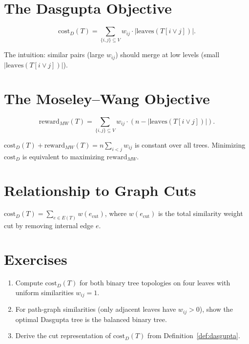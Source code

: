 \section{The Dasgupta Objective}

\begin{definition}
\label{def:dasgupta}
\[
\mathrm{cost}_D(T) = \sum_{\{i,j\} \subseteq V} w_{ij} \cdot |\mathrm{leaves}(T[i \vee j])|.
\]
\end{definition}

The intuition: similar pairs (large $w_{ij}$) should merge at low levels (small $|\mathrm{leaves}(T[i\vee j])|$).

\section{The Moseley--Wang Objective}

\begin{definition}
\label{def:mw}
\[
\mathrm{reward}_{MW}(T) = \sum_{\{i,j\} \subseteq V} w_{ij} \cdot (n - |\mathrm{leaves}(T[i \vee j])|).
\]
\end{definition}

\begin{proposition}
$\mathrm{cost}_D(T) + \mathrm{reward}_{MW}(T) = n\sum_{i<j}w_{ij}$ is constant over all trees. Minimizing $\mathrm{cost}_D$ is equivalent to maximizing $\mathrm{reward}_{MW}$.
\end{proposition}

\section{Relationship to Graph Cuts}

\begin{proposition}
$\mathrm{cost}_D(T) = \sum_{e \in E(T)} w(e_{\mathrm{cut}})$, where $w(e_{\mathrm{cut}})$ is the total similarity weight cut by removing internal edge $e$.
\end{proposition}

\section{Exercises}

\begin{enumerate}
  \item Compute $\mathrm{cost}_D(T)$ for both binary tree topologies on four leaves with uniform similarities $w_{ij}=1$.
  \item For path-graph similarities (only adjacent leaves have $w_{ij}>0$), show the optimal Dasgupta tree is the balanced binary tree.
  \item Derive the cut representation of $\mathrm{cost}_D(T)$ from Definition~\ref{def:dasgupta}.
\end{enumerate}
